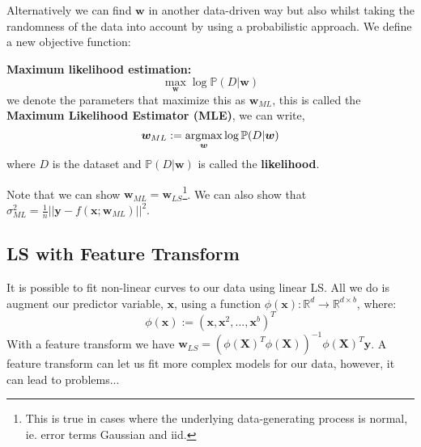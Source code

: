 Alternatively we can find $\bm{w}$ in another data-driven way but also whilst taking the randomness of the data into account by using a probabilistic approach. We define a new objective function:
\begin{definition}
    \textbf{Maximum likelihood estimation:} \\
    \begin{equation}
        \max_{\bm{w}} \log \mathbb{P}(D| \bm{w})
    \end{equation}
    we denote the parameters that maximize this as $\bm{w}_{ML}$, this is called the \textbf{Maximum Likelihood Estimator (MLE)}, we can write,
    \begin{equation}
        \bm{w}_{ML} := \operatorname*{arg\!\max}_{\bm{w}} \log \mathbb{P}(D|\bm{w}) 
    \end{equation}
    where $D$ is the dataset and $\mathbb{P}(D|\bm{w})$ is called the \textbf{likelihood}. 
\end{definition}
Note that we can show $\bm{w}_{ML}=\bm{w}_{LS}$\footnote{This is true in cases where the underlying data-generating process is normal, ie. error terms Gaussian and iid.}. We can also show that $\sigma_{ML}^{2} = \frac{1}{n} || \bm{y}-f(\bm{x};\bm{w}_{ML})||^{2}$.

\subsection{LS with Feature Transform}
It is possible to fit non-linear curves to our data using linear LS. All we do is augment our predictor variable, $\bm{x}$, using a function $\phi(\bm{x}): \mathbb{R}^{d} \to \mathbb{R}^{d \times b}$, where:
\begin{equation}
    \phi(\bm{x}) := (\bm{x}, \bm{x}^{2}, ..., \bm{x}^{b})^{T}
\end{equation}
With a feature transform we have $\bm{w}_{LS} = (\phi(\bm{X})^{T} \phi(\bm{X}))^{-1} \phi(\bm{X})^{T} \bm{y} $. A feature transform can let us fit more complex models for our data, however, it can lead to problems...

